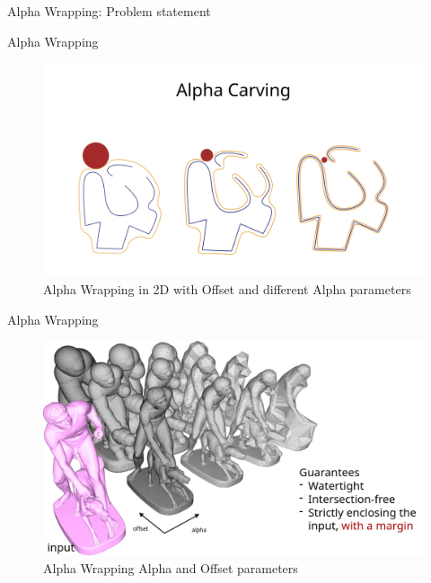 \documentclass[12pt]{beamer}
\begin{document}
\begin{frame}{Alpha Wrapping: Problem statement}
\begin{figure}[H]
\begin{minipage}{0.45\textwidth}
    \end{minipage}
  \end{figure}
\end{frame}


\begin{frame}{Alpha Wrapping}
  \begin{figure}[H]
    \centering
    \includegraphics[width=1.1\textwidth]{images/alpha-wrapping_ball.jpg}
    \caption{Alpha Wrapping in 2D with Offset and different Alpha parameters}
\end{figure}
\end{frame}

\begin{frame}{Alpha Wrapping}
  \begin{figure}[H]
    \centering
    \includegraphics[width=1.1\textwidth]{images/alpha-wrapping_alpha_offset.jpg}
    \caption{Alpha Wrapping Alpha and Offset parameters}
\end{figure}
\end{frame}
\end{document}
